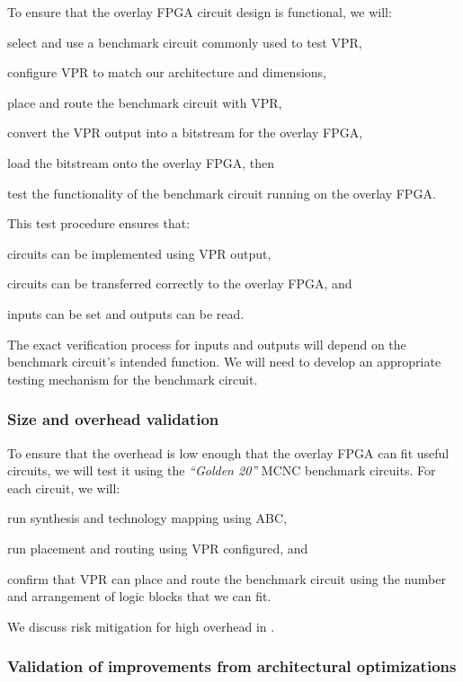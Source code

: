 To ensure that the overlay FPGA circuit design is functional, we will:
\begin{enumeration}
	\item select and use a benchmark circuit commonly used to test VPR,
	\item configure VPR to match our architecture and dimensions,
	\item place and route the benchmark circuit with VPR,
	\item convert the VPR output into a bitstream for the overlay FPGA,
	\item load the bitstream onto the overlay FPGA, then 
	\item test the functionality of the benchmark circuit running on the overlay FPGA.
\end{enumeration}
This test procedure ensures that:
\begin{itemlist}
	\item circuits can be implemented using VPR output,
	\item circuits can be transferred correctly to the overlay FPGA, and
	\item inputs can be set and outputs can be read.
\end{itemlist}
The exact verification process for inputs and outputs will depend on the benchmark circuit's intended function.
We will need to develop an appropriate testing mechanism for the benchmark circuit.


\subsubsection{Size and overhead validation}

To ensure that the overhead is low enough that the overlay FPGA can fit useful circuits, we will test it using the \emph{``Golden 20''} MCNC benchmark circuits.
For each circuit, we will:
\begin{enumeration}
	\item run synthesis and technology mapping using ABC,
	\item run placement and routing using VPR configured, and
	\item confirm that VPR can place and route the benchmark circuit using the number and arrangement of logic blocks that we can fit.
\end{enumeration}
We discuss risk mitigation for high overhead in .


\subsubsection{Validation of improvements from architectural optimizations}

